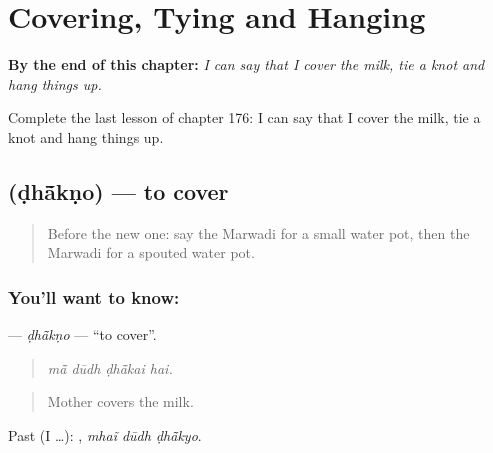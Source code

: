 
\chapter{Covering, Tying and Hanging}
\label{ch:mw-covering-tying-and-hanging}

\begin{chapteropening}
\textbf{By the end of this chapter:} \emph{I can say that I cover the milk, tie a knot and hang things up.}

Complete the last lesson of chapter 176: I can say that I cover the milk, tie a knot and hang things up.
\end{chapteropening}

\section[\texorpdfstring{\mw{ढांकणो} (ḍhā̃kṇo)}{ढांकणो (ḍhā̃kṇo)}]{ (ḍhā̃kṇo) — to cover}

\label{lesson:MW-C176-dhakno}



\begin{quote}
Before the new one: say the Marwadi for a small water pot, then the Marwadi for a spouted water pot.
\end{quote}

\subsection*{You'll want to know: }
\textbf{} — \emph{ḍhā̃kṇo} — \textquotedblleft{}to cover\textquotedblright{}.

\begin{quote}
   
\end{quote}

\begin{quote}
\emph{mā̃ dūdh ḍhā̃kai hai.}
\end{quote}

\begin{quote}
Mother covers the milk.
\end{quote}

Past (I …):   , \emph{mhaĩ dūdh ḍhā̃kyo}.

